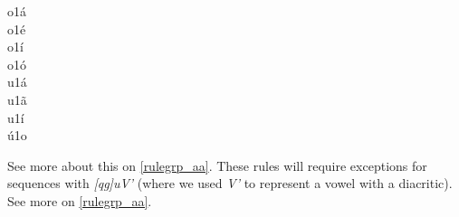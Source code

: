 \begin{multicols}{5}
{o1á \\ o1é \\ o1í \\ o1ó \\ 
u1á \\ u1ã \\ u1í \\ ú1o
}
\end{multicols}
See more about this on \cref{rulegrp_aa}. These rules will require exceptions for sequences with \emph{[qg]uV'} 
(where we used \emph{V'} to represent a vowel with a diacritic). See more on \cref{rulegrp_aa}.

